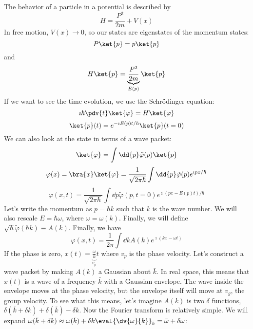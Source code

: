 \documentclass[a4paper,twoside,master.tex]{subfiles}
\begin{document}
The behavior of a particle in a potential is described by
\begin{equation}
    H = \frac{P^2}{2m} + V(x)
\end{equation}
In free motion, $ V(x) \to 0 $, so our states are eigenstates of the momentum states:
\begin{equation}
    P \ket{p} = p \ket{p}
\end{equation}
and
\begin{equation}
    H \ket{p} = \underbrace{\frac{P^2}{2m}}_{E(p)} \ket{p}
\end{equation}
If we want to see the time evolution, we use the Schr\"odinger equation:
\begin{equation}
    \imath\hbar\pdv{t} \ket{\varphi} = H \ket{\varphi}
\end{equation}
\begin{equation}
    \ket{p}(t) = e^{-\imath E(p) t / \hbar} \ket{p} (t=0)
\end{equation}
We can also look at the state in terms of a wave packet:
\begin{equation}
    \ket{\varphi} = \int \dd{p} \tilde{\varphi}(p) \ket{p}
\end{equation}
\begin{equation}
    \varphi (x) = \bra{x} \ket{\varphi} = \frac{1}{\sqrt{2 \pi \hbar}} \int \dd{p}\tilde{\varphi}(p) e^{\imath px/\hbar}
\end{equation}
\begin{equation}
    \varphi(x,t) = \frac{1}{\sqrt{2 \pi \hbar}} \int \dd{p} \tilde{\varphi}(p,t=0)e^{\imath(px-E(p)t)/\hbar}
\end{equation}
Let's write the momentum as $ p = \hbar k $ such that $ k $ is the wave number. We will also rescale $ E = \hbar\omega $, where $ \omega = \omega(k) $. Finally, we will define $ \sqrt{\hbar} \tilde{\varphi}(\hbar k) \equiv A(k) $. Finally, we have
\begin{equation}
    \varphi (x,t) = \frac{1}{2 \pi} \int \dd{k} A(k) e^{\imath(kx-\omega t)}
\end{equation}
If the phase is zero, $ x(t) = \underbrace{\frac{\omega}{k}}_{v_p} t $ where $ v_p $ is the phase velocity. Let's construct a wave packet by making $ A(k) $ a Gaussian about $ \bar{k} $. In real space, this means that $ x(t) $ is a wave of a frequency $ \bar{k} $ with a Gaussian envelope. The wave inside the envelope moves at the phase velocity, but the envelope itself will move at $ v_g $, the group velocity. To see what this means, let's imagine $ A(k) $ is two $\delta$ functions, $ \delta(\bar{k} + \delta k) + \delta(\bar{k}) - \delta k $. Now the Fourier transform is relatively simple. We will expand $ \omega(\bar{k}+\delta k) \approx \omega(\bar{k}) + \delta k \eval{\dv{\omega}{k}}_{\bar{k}} = \bar{\omega}+\delta\omega $:
\end{document}
